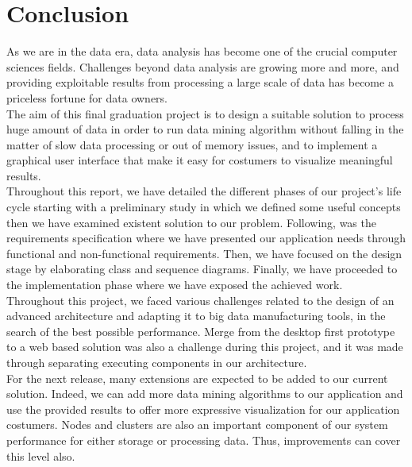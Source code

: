 \chapter*{Conclusion} 

As we are in the data era, data analysis has become one of the crucial computer sciences fields. Challenges beyond data analysis are growing more and more, and providing exploitable results from processing a large scale of data has become a priceless fortune for data owners.\\

The aim of this final graduation project is to design a suitable solution to process huge amount of data in order to run data mining algorithm without falling in the matter of slow data processing or out of memory issues, and to implement a graphical user interface that make it easy for costumers to visualize meaningful results.\\

Throughout this report, we have detailed the different phases of our project's life cycle starting with a preliminary study in which we defined some useful concepts then we have examined existent solution to our problem. Following, was the requirements specification where we have presented our application needs through functional and non-functional requirements. Then, we have focused on the design stage by elaborating class and sequence diagrams. Finally, we have proceeded to the implementation phase where we have exposed the achieved work.\\

Throughout this project, we faced various challenges related to the design of an advanced architecture and adapting it to big data manufacturing tools, in the search of the best possible performance. Merge from the desktop first prototype to a web based solution was also a challenge during this project, and it was made through separating executing components in our architecture.\\

For the next release, many extensions are expected to be added to our current solution. Indeed, we can add more data mining algorithms to our application and use the provided results to offer more expressive visualization for our application costumers. Nodes and clusters are also an important component of our system performance for either storage or processing data. Thus, improvements can cover this level also. 


